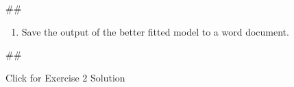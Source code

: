 \documentclass[
]{book}
\newenvironment{Shaded}{\begin{snugshade}}{\end{snugshade}}
\newcommand{\NormalTok}[1]{#1}
\providecommand{\tightlist}{%
  \setlength{\itemsep}{0pt}\setlength{\parskip}{0pt}}
\begin{document}
\begin{Shaded}
\begin{Highlighting}[]
\NormalTok{\#\#}
\end{Highlighting}
\end{Shaded}

\begin{enumerate}
\def\labelenumi{\arabic{enumi}.}
\setcounter{enumi}{2}
\tightlist
\item
  Save the output of the better fitted model to a word document.
\end{enumerate}

\begin{Shaded}
\begin{Highlighting}[]
\NormalTok{\#\#}
\end{Highlighting}
\end{Shaded}

{Click for Exercise 2 Solution}
\end{document}
